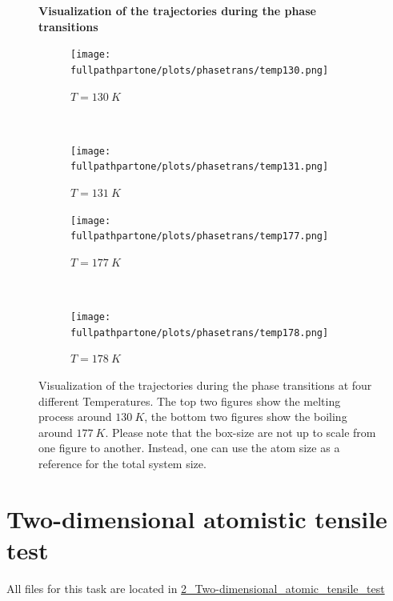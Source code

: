 \documentclass[10pt,a4paper]{report}
\def \pathparttwo {../../2_Two-dimensional_atomic_tensile_test}
\def \fullpathpartone {/home/lukas/Desktop/project/independence/atomistic_modeling/exam/1_three-dimensional_atomic_system}
\newcommand*{\figuretitle}[1]{%
    {\centering%
    \textbf{#1}%
    \par\medskip}%
}
\begin{document}
\begin{center}
\begin{figure}[h]
\figuretitle{Visualization of the trajectories during the phase transitions}
\begin{subfigure}{0.5\textwidth}
  \texttt{[image: \\fullpathpartone/plots/phasetrans/temp130.png]}
  \caption{$T=130~K$}
\end{subfigure}~
\begin{subfigure}{0.5\textwidth}
  \texttt{[image: \\fullpathpartone/plots/phasetrans/temp131.png]}
  \caption{$T=131~K$}
\end{subfigure}

\begin{subfigure}{0.5\textwidth}
  \texttt{[image: \\fullpathpartone/plots/phasetrans/temp177.png]}
  \caption{$T=177~K$}
\end{subfigure}~
\begin{subfigure}{0.5\textwidth}
  \texttt{[image: \\fullpathpartone/plots/phasetrans/temp178.png]}
  \caption{$T=178~K$}
\end{subfigure}
\caption[Visualization of the trajectories during the phase transitions]{Visualization of the trajectories during the phase transitions at four different Temperatures. The top two figures show the melting process around $130~K$, the bottom two figures show the boiling around $177~K$. Please note that the box-size are not up to scale from one figure to another. Instead, one can use the atom size as a reference for the total system size.}
\label{fig:p1_phasetransitions_snapshots}
\end{figure}
\end{center}










\FloatBarrier
\pagebreak
\chapter{Two-dimensional atomistic tensile test}
All files for this task are located in \href{\pathparttwo}{2\_Two-dimensional\_atomic\_tensile\_test}\\
\end{document}
